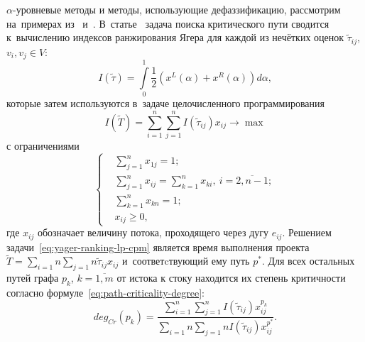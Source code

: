 $\alpha$-уровневые методы и методы, использующие дефаззификацию, рассмотрим на~примерах из~\cite{Indians_FCPM} и~\cite{Chinese_CPM}. В~статье~\cite{Chinese_CPM} задача поиска критического пути сводится к~вычислению индексов ранжирования Ягера для каждой из нечётких оценок $\tilde \tau_{ij}$, $v_i,v_j \in V$:
\begin{equation*}
  I\left(\tilde \tau \right) = \int \limits_{0}^{1}{\frac{1}{2}\left(x^L \left(\alpha \right)+x^R \left(\alpha \right) \right) d\alpha},
\end{equation*}
которые затем используются в~задаче целочисленного программирования
\begin{equation}
\label{eq:yager-ranking-lp-cpm}
  I \left( \tilde T \right) = \sum \limits_{i=1}^{n}\sum \limits_{j=1}^{n} I\left(\tilde \tau_{ij} \right)x_{ij} \to \max
\end{equation}
с ограничениями
\begin{equation}
\label{eq:lp-cpm-int-constraints}
  \left \{ \begin{aligned}
    & \sum \limits_{j=1}^n x_{1j}=1; \\
    & \sum \limits_{j=1}^n x_{ij}= \sum \limits_{k=1}^n x_{ki},\ i=\overline {2, n-1}; \\
    & \sum \limits_{k=1}^{n} x_{kn}=1; \\
    & x_{ij} \geqslant 0,
  \end{aligned} \right.
\end{equation}
где $x_{ij}$ обозначает величину потока, проходящего через дугу $e_{ij}$. Решением задачи~\eqref{eq:yager-ranking-lp-cpm} является время выполнения проекта $\displaystyle \tilde T = \sum \limits_{i=1}{n} \sum \limits_{j=1}{n} \tilde \tau_{ij} x_{ij}$ и~соответcтвующий ему путь $p^*$. Для всех остальных путей графа $p_k$, $k=\overline{1,m}$ от истока к стоку находится их степень критичности согласно формуле~\eqref{eq:path-criticality-degree}:
\begin{equation}
\label{eq:path-criticality-degree}
  deg_{Cr}\left(p_k \right) = \frac{\sum \limits_{i=1}^{n} \sum \limits_{j=1}^{n} I\left(\tilde \tau_{ij} \right) x_{ij}^{p_k}}{\sum \limits_{i=1}{n} \sum \limits_{j=1}{n} I\left( \tilde \tau_{ij} \right) x_{ij}^{p^*}}.
\end{equation}

